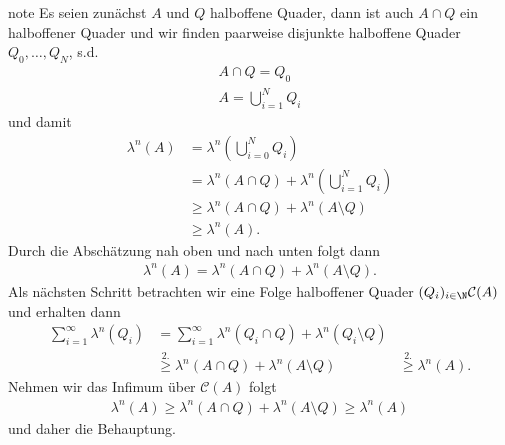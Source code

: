 \documentclass[letterpaper,10pt,german]{jupyterBook}
\begin{document}
\begin{sphinxadmonition}{note}
\sphinxAtStartPar
Es seien zunächst \(A\) und \(Q\) halboffene Quader, dann ist auch \(A\cap Q\) ein halboffener Quader und wir finden paarweise disjunkte halboffene Quader \(Q_0,\ldots,Q_N\), s.d.
\begin{equation*}
\begin{split}A\cap Q = Q_0\\
A = \bigcup_{i=1}^N Q_i\end{split}
\end{equation*}
\sphinxAtStartPar
und damit
\begin{equation*}
\begin{split}\lambda^n(A) &= \lambda^n\left(\bigcup_{i=0}^N Q_i\right)\\
&= 
\lambda^n(A\cap Q) + \lambda^n\left(\bigcup_{i=1}^N Q_i\right)\\
&\geq \lambda^n(A\cap Q) + \lambda^n(A\setminus Q) \\
&\geq \lambda^n(A).\end{split}
\end{equation*}
\sphinxAtStartPar
Durch die Abschätzung nah oben und nach unten folgt dann
\begin{equation*}
\begin{split}\lambda^n(A) = \lambda^n(A\cap Q) + \lambda^n(A\setminus Q).\end{split}
\end{equation*}
\sphinxAtStartPar
Als nächsten Schritt betrachten wir eine Folge halboffener Quader \((Q_i)_{i\in\N}\mathcal{C}(A)\) und erhalten dann
\begin{equation*}
\begin{split}\sum_{i=1}^\infty \lambda^n(Q_i) &= 
\sum_{i=1}^\infty \lambda^n(Q_i\cap Q) + \lambda^n(Q_i\setminus Q)\\
&\overset{2.}{\geq}
\lambda^n(A\cap Q) + \lambda^n(A\setminus Q)
&\overset{2.}{\geq}
\lambda^n(A).\end{split}
\end{equation*}
\sphinxAtStartPar
Nehmen wir das Infimum über \(\mathcal{C}(A)\) folgt
\begin{equation*}
\begin{split}\lambda^n(A) \geq \lambda^n(A\cap Q) + \lambda^n(A\setminus Q) \geq 
\lambda^n(A)\end{split}
\end{equation*}
\sphinxAtStartPar
und daher die Behauptung.
\end{sphinxadmonition}
\end{document}
